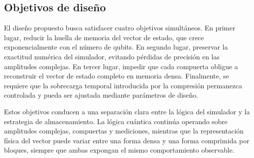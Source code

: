 \subsection{Objetivos de diseño}

El diseño propuesto busca satisfacer cuatro objetivos simultáneos. En primer lugar, reducir la huella de memoria del vector de estado, que crece
exponencialmente con el número de qubits. En segundo lugar, preservar la exactitud numérica del simulador, evitando pérdidas de precisión en las
amplitudes complejas. En tercer lugar, impedir que cada compuerta obligue a reconstruir el vector de estado completo en memoria densa. Finalmente,
se requiere que la sobrecarga temporal introducida por la compresión permanezca controlada y pueda ser ajustada mediante parámetros de diseño.

Estos objetivos conducen a una separación clara entre la lógica del simulador y la estrategia de almacenamiento. La lógica cuántica continúa
operando sobre amplitudes complejas, compuertas y mediciones, mientras que la representación física del vector puede variar entre una forma densa
y una forma comprimida por bloques, siempre que ambas expongan el mismo comportamiento observable.
